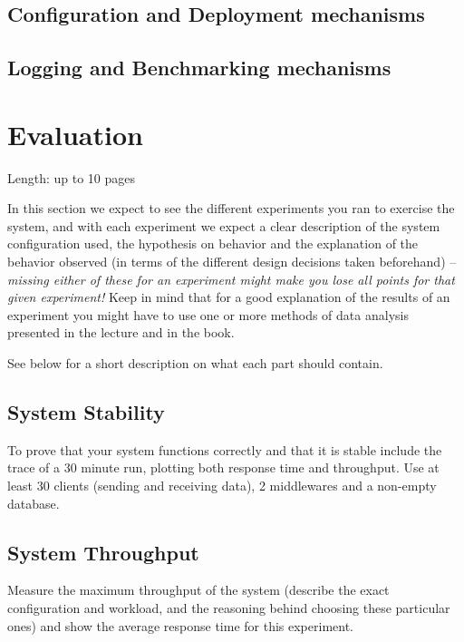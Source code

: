 \documentclass[11pt]{article}
\begin{document}
\subsection{Configuration and Deployment mechanisms}\label{sec:configuration-and-deployment-mechanisms}

\subsection{Logging and Benchmarking mechanisms}\label{sec:logging-and-benchmarking-mechanisms}

\section{Evaluation}\label{sec:evaluation}

Length: up to 10 pages

In this section we expect to see the different experiments you ran to
exercise the system, and with each experiment we expect a clear
description of the system configuration used, the hypothesis on behavior
and the explanation of the behavior observed (in terms of the different
design decisions taken beforehand) -- \emph{missing either of these for
an experiment might make you lose all points for that given experiment!}
Keep in mind that for a good explanation of the results of an experiment
you might have to use one or more methods of data analysis presented in
the lecture and in the book.

See below for a short description on what each part should contain.

\subsection{System Stability}\label{sec:system-stability}

To prove that your system functions correctly and that it is stable
include the trace of a 30 minute run, plotting both response time and
throughput. Use at least 30 clients (sending and receiving data), 2
middlewares and a non-empty database.

\subsection{System Throughput}\label{sec:system-throughput}

Measure the maximum throughput of the system (describe the exact
configuration and workload, and the reasoning behind choosing these
particular ones) and show the average response time for this experiment.
\end{document}

